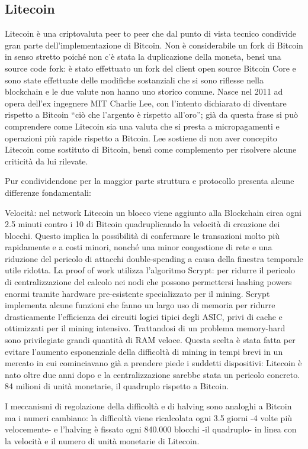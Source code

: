 \subsection{Litecoin}
Litecoin è una criptovaluta peer to peer che dal punto di vista tecnico condivide gran parte dell’implementazione di Bitcoin. Non è considerabile un fork di Bitcoin in senso stretto poiché non c’è stata la duplicazione della moneta, bensì una source code fork: è stato effettuato un fork del client open source Bitcoin Core e sono state effettuate delle modifiche sostanziali che si sono riflesse nella blockchain e le due valute non hanno uno storico comune. 
Nasce nel 2011 ad opera dell’ex ingegnere MIT Charlie Lee, con l’intento dichiarato di diventare rispetto a Bitcoin “ciò che l’argento è rispetto all’oro”; già da questa frase si può comprendere come Litecoin sia una valuta che si presta a micropagamenti e operazioni più rapide rispetto a Bitcoin. Lee sostiene di non aver concepito Litecoin come sostituto di Bitcoin, bensì come complemento per risolvere alcune criticità da lui rilevate.

Pur condividendone per la maggior parte struttura e protocollo presenta alcune differenze fondamentali:

Velocità: nel network Litecoin un blocco viene aggiunto alla Blockchain circa ogni 2.5 minuti contro i 10 di Bitcoin quadruplicando la velocità di creazione dei blocchi. Questo implica la possibilità di confermare le transazioni molto più rapidamente e a costi minori, nonché una minor congestione di rete e una riduzione del pericolo di attacchi double-spending a causa della finestra temporale utile ridotta.
La proof of work utilizza l’algoritmo Scrypt: per ridurre il pericolo di centralizzazione del calcolo nei nodi che possono permettersi hashing powers enormi tramite hardware pre-esistente specializzato per il mining.
Scrypt implementa alcune funzioni che fanno un largo uso di memoria per ridurre drasticamente l’efficienza dei circuiti logici tipici degli ASIC, privi di cache e ottimizzati per il mining intensivo. Trattandosi di un problema memory-hard sono privilegiate grandi quantità di RAM veloce. 
Questa scelta è stata fatta per evitare l’aumento esponenziale della difficoltà di mining in tempi brevi in un mercato in cui cominciavano già a prendere piede i suddetti dispositivi: Litecoin è nato oltre due anni dopo e la centralizzazione sarebbe stata un pericolo concreto.
84 milioni di unità monetarie, il quadruplo rispetto a Bitcoin.

I meccanismi di regolazione della difficoltà e di halving sono analoghi a Bitcoin ma i numeri cambiano: la difficoltà viene ricalcolata ogni 3.5 giorni -4 volte più velocemente- e l’halving è fissato ogni 840.000 blocchi -il quadruplo- in linea con la velocità e il numero di unità monetarie di Litecoin.


